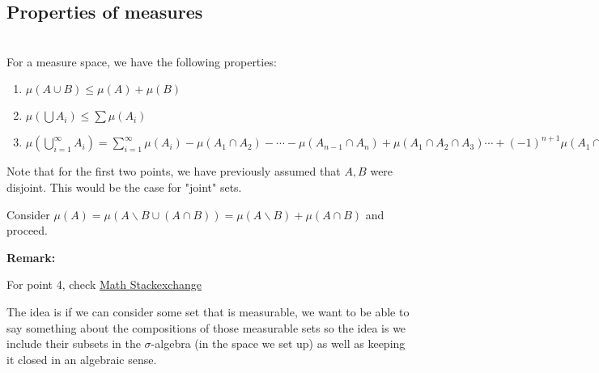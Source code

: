 \subsection{Properties of measures}\hfill\\
\noindent For a measure space, we have the following properties:\par
\begin{enumerate}[leftmargin=*]
  \item $\mu(A\cup B)\leq \mu(A)+\mu(B)$
  \item $\mu\left(\bigcup A_i\right)\leq \sum\mu(A_i)$
  \item $\mu\left(\bigcup_{i=1}^{\infty}A_i\right) = \sum_{i=1}^{\infty}\mu(A_i)-\mu(A_1\cap A_2)-\cdots-\mu(A_{n-1}\cap A_n) + \mu(A_1\cap A_2\cap A_3)\cdots + (-1)^{n+1}\mu(A_1\cap A_2\cdots\cap A_n)$
\end{enumerate}
\par\bigskip
\noindent Note that for the first two points, we have previously assumed that $A,B$ were disjoint. This would be the case for "joint" sets.
\par\bigskip
\begin{prf}[]{}
  Consider $\mu(A) = \mu(A\backslash B\cup (A\cap B)) = \mu(A\backslash B) + \mu(A\cap B)$ and proceed.
\end{prf}
\par\bigskip
\noindent\textbf{Remark:}\par
\noindent For point 4, check \href{https://math.stackexchange.com/questions/1487456/a-closed-formula-for-the-measure-of-the-union-of-n-sets}{Math Stackexchange}
\par\bigskip
\noindent The idea is if we can consider some set that is measurable, we want to be able to say something about the compositions of those measurable sets so the idea is we include their subsets in the $\sigma$-algebra (in the space we set up) as well as keeping it closed in an algebraic sense.
\par\bigskip
